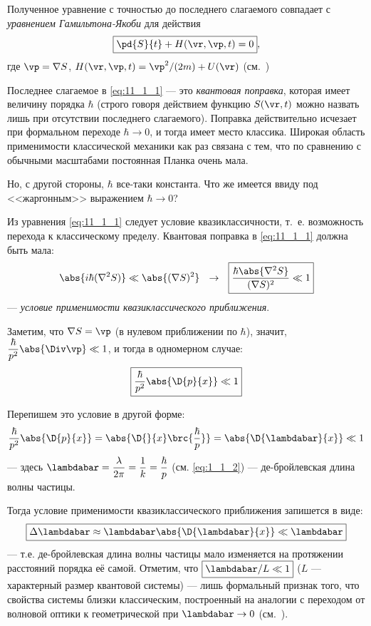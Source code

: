 Полученное уравнение с точностью до последнего слагаемого совпадает с {\em уравнением Гамильтона-Якоби}\footnotemark{} для действия
$$
\boxed{\pd{S}{t} + H(\vr,\vp,t) = 0},
$$
где $\vp=\nabla S$, $H(\vr,\vp,t) = {\vp^2}/{(2m)} + U(\vr)$ (см.~)

Последнее слагаемое в \eqref{eq:11_1_1} --- это {\em квантовая поправка}, которая имеет величину порядка $\hbar$ (строго говоря действием функцию $S(\vr, t)$ можно назвать лишь при отсутствии последнего слагаемого). Поправка действительно исчезает при формальном переходе $\hbar \to 0$, и тогда имеет место классика. Широкая область применимости классической механики как раз связана с тем, что по сравнению с обычными масштабами постоянная Планка очень мала.

Но, с другой стороны, $\hbar$ все-таки константа. Что же имеется ввиду под <<жаргонным>> выражением $\hbar \to 0$?

Из уравнения \eqref{eq:11_1_1} следует условие квазиклассичности, т.~е. возможность перехода к классическому пределу. Квантовая поправка в \eqref{eq:11_1_1} должна быть мала:
$$
\abs{i\hbar(\nabla^2 S)} \ll \abs{(\nabla S)^2} ~~\rightarrow~~ \boxed{\frac{\hbar \abs{\nabla^2 S}}{(\nabla S)^2} \ll 1} 
$$
--- {\em условие применимости квазиклассического приближения}.

Заметим, что $\nabla S =\vp$ (в нулевом приближении по $\hbar$), значит, ${\dfrac{\hbar}{p^2}\abs{\Div \vp} \ll 1}$, и тогда в одномерном случае:
$$
\boxed{\frac{\hbar}{p^2}\abs{\D{p}{x}} \ll 1}
$$

Перепишем это условие в другой форме:
$$
\frac{\hbar}{p^2} \abs{\D{p}{x}} = 
\abs{\D{}{x}\brc{\frac{\hbar}{p}}} = \abs{\D{\lambdabar}{x}} \ll 1
$$
--- здесь $\lambdabar = \dfrac{\lambda}{2\pi} = \dfrac{1}{k} = \dfrac{\hbar}{p}$ (см. \eqref{eq:1_1_2}) --- де-бройлевская длина волны частицы.

Тогда условие применимости квазиклассического приближения запишется в виде:
$$
\boxed{\Delta \lambdabar \approx \lambdabar \abs{\D{\lambdabar}{x}} \ll \lambdabar}
$$
--- т.е. де-бройлевская длина волны частицы мало изменяется на протяжении расстояний порядка её самой. Отметим, что $\boxed{\lambdabar/L \ll 1}$ ($L$ --- характерный размер квантовой системы) --- лишь формальный признак того, что свойства системы близки  классическим, построенный на аналогии с переходом от волновой оптики к геометрической при $\lambdabar \to 0$ (см.~).


